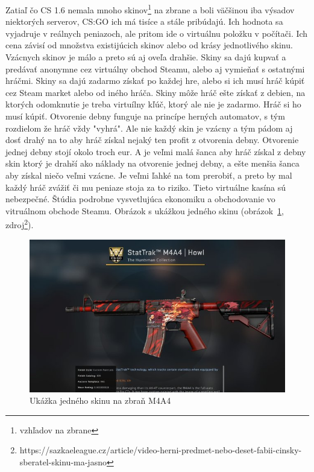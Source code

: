\documentclass[10pt,oneside,slovak,a4paper]{article}
\begin{document}
Zatiaľ čo CS 1.6 nemala mnoho skinov\footnote{vzhľadov na zbrane} na zbrane a boli väčšinou iba výsadov niektorých serverov, CS:GO ich má tisíce a stále pribúdajú. Ich hodnota sa vyjadruje v reálnych peniazoch, ale pritom ide o virtuálnu položku v počítači. Ich cena závisí od množstva existijúcich skinov alebo od krásy jednotlivého skinu. Vzácnych skinov je málo a preto sú aj oveľa drahšie. Skiny sa dajú kupvať a predávať anonymne cez virtuálny obchod Steamu, alebo aj vymieňať s ostatnými hráčmi.
Skiny sa dajú zadarmo získať  po každej hre, alebo si ich musí hráč kúpiť cez Steam market alebo od iného hráča. Skiny môže hráč ešte získať z debien, na ktorých odomknutie je treba virtuílny kľúč, ktorý ale nie je zadarmo. Hráč si ho musí kúpiť. Otvorenie debny funguje na princípe herných automatov, s tým rozdielom že hráč vždy "vyhrá". Ale nie každý skin je vzácny a tým pádom aj dosť drahý na to aby hráč získal nejaký ten profit z otvorenia debny. Otvorenie jednej debny stojí okolo troch eur. A je veľmi malá šanca aby hráč získal z debny skin ktorý je drahší ako náklady na otvorenie jednej debny, a ešte menšia šanca aby získal niečo veľmi vzácne. Je veľmi ľahké na tom prerobiť, a preto by mal každý hráč zvážiť či mu peniaze stoja za to riziko. Tieto virtuálne kasína sú nebezpečné. Štúdia podrobne vysvetlujúca ekonomiku a obchodovanie vo vitruálnom obchode Steamu\cite{7377220}. Obrázok s ukážkou jedného skinu (obrázok~\ref{f:skiny}, zdroj\footnote{https://sazkaeleague.cz/article/video-herni-predmet-nebo-deset-fabii-cinsky-sberatel-skinu-ma-jasno}).

\begin{figure}[tbh]
\centering
\includegraphics[scale=0.45]{skin.jpg}
\caption{Ukážka jedného skinu na zbraň M4A4}
\label{f:skiny}
\end{figure}
\end{document}
